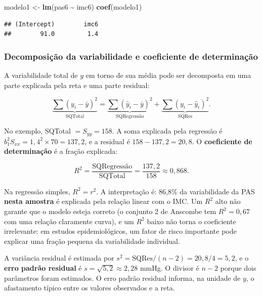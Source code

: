 \documentclass[
]{book}
\newenvironment{Shaded}{\begin{snugshade}}{\end{snugshade}}
\newcommand{\FunctionTok}[1]{\textcolor[rgb]{0.13,0.29,0.53}{\textbf{#1}}}
\newcommand{\NormalTok}[1]{#1}
\newcommand{\OtherTok}[1]{\textcolor[rgb]{0.56,0.35,0.01}{#1}}
\newcommand{\SpecialCharTok}[1]{\textcolor[rgb]{0.81,0.36,0.00}{\textbf{#1}}}
\begin{document}
\begin{Shaded}
\begin{Highlighting}[]
\NormalTok{modelo1 }\OtherTok{\textless{}{-}} \FunctionTok{lm}\NormalTok{(pas6 }\SpecialCharTok{\textasciitilde{}}\NormalTok{ imc6)}
\FunctionTok{coef}\NormalTok{(modelo1)}
\end{Highlighting}
\end{Shaded}

\begin{verbatim}
## (Intercept)        imc6 
##        91.0         1.4
\end{verbatim}

\subsubsection{Decomposição da variabilidade e coeficiente de determinação}\label{decomposiuxe7uxe3o-da-variabilidade-e-coeficiente-de-determinauxe7uxe3o}

A variabilidade total de \(y\) em torno de sua média pode ser decomposta em uma parte explicada pela reta e uma parte residual:

\[
\underbrace{\sum (y_i - \bar{y})^2}_{\text{SQTotal}} = \underbrace{\sum (\hat{y}_i - \bar{y})^2}_{\text{SQRegressão}} + \underbrace{\sum (y_i - \hat{y}_i)^2}_{\text{SQRes}} .
\]

No exemplo, SQTotal \(= S_{yy} = 158\). A soma explicada pela regressão é \(b_1^2 S_{xx} = 1{,}4^2 \times 70 = 137{,}2\), e a residual é \(158 - 137{,}2 = 20{,}8\). O \textbf{coeficiente de determinação} é a fração explicada:

\[
R^2 = \frac{\text{SQRegressão}}{\text{SQTotal}} = \frac{137{,}2}{158} \approx 0{,}868.
\]

Na regressão simples, \(R^2 = r^2\). A interpretação é: 86,8\% da variabilidade da PAS \textbf{nesta amostra} é explicada pela relação linear com o IMC. Um \(R^2\) alto não garante que o modelo esteja correto (o conjunto 2 de Anscombe tem \(R^2 = 0{,}67\) com uma relação claramente curva), e um \(R^2\) baixo não torna o coeficiente irrelevante: em estudos epidemiológicos, um fator de risco importante pode explicar uma fração pequena da variabilidade individual.

A variância residual é estimada por \(s^2 = \text{SQRes}/(n - 2) = 20{,}8/4 = 5{,}2\), e o \textbf{erro padrão residual} é \(s = \sqrt{5{,}2} \approx 2{,}28\) mmHg. O divisor é \(n - 2\) porque dois parâmetros foram estimados. O erro padrão residual informa, na unidade de \(y\), o afastamento típico entre os valores observados e a reta.
\end{document}
